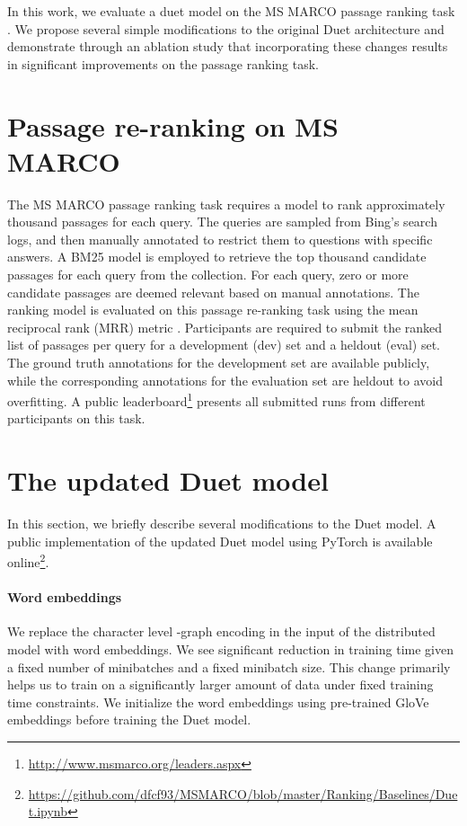 \documentclass{article}
\begin{document}
In this work, we evaluate a duet model on the MS MARCO passage ranking task \citep{bajaj2016ms}.
We propose several simple modifications to the original Duet architecture and demonstrate through an ablation study that incorporating these changes results in significant improvements on the passage ranking task.
 \section{Passage re-ranking on MS MARCO}
\label{sec:task}
The MS MARCO passage ranking task \citep{bajaj2016ms} requires a model to rank approximately thousand passages for each query.
The queries are sampled from Bing's search logs, and then manually annotated to restrict them to questions with specific answers.
A BM25 \citep{robertson2009probabilistic} model is employed to retrieve the top thousand candidate passages for each query from the collection.
For each query, zero or more candidate passages are deemed relevant based on manual annotations.
The ranking model is evaluated on this passage re-ranking task using the mean reciprocal rank (MRR) metric \citep{craswell2009mean}.
Participants are required to submit the ranked list of passages per query for a development (dev) set and a heldout (eval) set.
The ground truth annotations for the development set are available publicly, while the corresponding annotations for the evaluation set are heldout to avoid overfitting.
A public leaderboard\footnote{\url{http://www.msmarco.org/leaders.aspx}} presents all submitted runs from different participants on this task.
 \section{The updated Duet model}
\label{sec:model}
In this section, we briefly describe several modifications to the Duet model.
A public implementation of the updated Duet model using PyTorch \citep{paszke2017automatic} is available online\footnote{\url{https://github.com/dfcf93/MSMARCO/blob/master/Ranking/Baselines/Duet.ipynb}}.

\paragraph{Word embeddings}
We replace the character level -graph encoding in the input of the distributed model with word embeddings.
We see significant reduction in training time given a fixed number of minibatches and a fixed minibatch size.
This change primarily helps us to train on a significantly larger amount of data under fixed training time constraints.
We initialize the word embeddings using pre-trained GloVe \citep{pennington2014glove} embeddings before training the Duet model.
\end{document}
